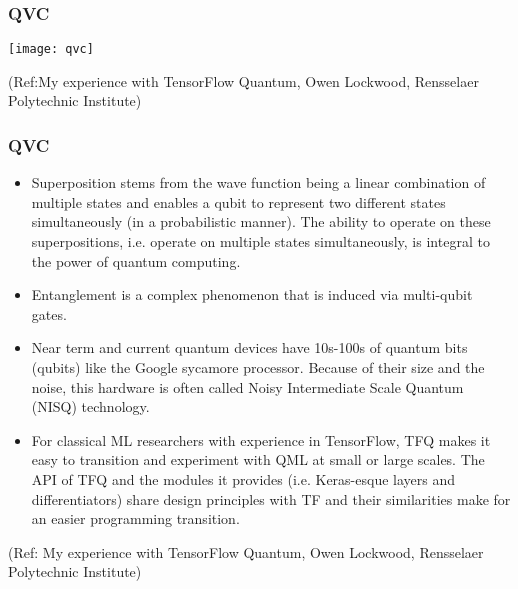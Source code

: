  \begin{frame}[fragile]\frametitle{QVC}

\begin{center}
\texttt{[image: qvc]}
\end{center}
	
\tiny{(Ref:My experience with TensorFlow Quantum,  Owen Lockwood, Rensselaer Polytechnic Institute)}

\end{frame}


 \begin{frame}[fragile]\frametitle{QVC}
\begin{itemize}
\item  Superposition stems from the wave function being a linear combination of multiple states and enables a qubit to represent two different states simultaneously (in a probabilistic manner). The ability to operate on these superpositions, i.e. operate on multiple states simultaneously, is integral to the power of quantum computing.
\item  Entanglement is a complex phenomenon that is induced via multi-qubit gates.
\item  Near term and current quantum devices have 10s-100s of quantum bits (qubits) like the Google sycamore processor. Because of their size and the noise, this hardware is often called Noisy Intermediate Scale Quantum (NISQ) technology.
\item  For classical ML researchers with experience in TensorFlow, TFQ makes it easy to transition and experiment with QML at small or large scales. The API of TFQ and the modules it provides (i.e. Keras-esque layers and differentiators) share design principles with TF and their similarities make for an easier programming transition.
\end{itemize}

	
\tiny{(Ref: My experience with TensorFlow Quantum,  Owen Lockwood, Rensselaer Polytechnic Institute)}

\end{frame}